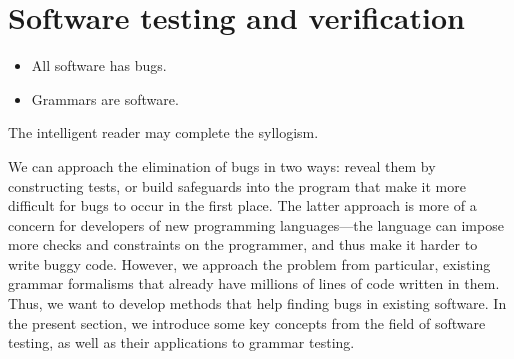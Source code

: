 \section{Software testing and verification}
\label{sec:testing-intro} 

\begin{itemize}
\item All software has bugs.
\item Grammars are software.
\end{itemize}

\noindent The intelligent reader may complete the syllogism.

We can approach the elimination of bugs in two ways: reveal them
by constructing tests, or build safeguards into the program that
make it more difficult for bugs to occur in the first place. The
latter approach is more of a concern for developers of new programming
languages---the language can impose more checks and constraints on the
programmer, and thus make it harder to write buggy code. However, we
approach the problem from particular, existing grammar formalisms that
already have millions of lines of code written in them. Thus, we want
to develop methods that help finding bugs in existing software.
In the present section, we introduce some key concepts from the field of
software testing, as well as their applications to grammar testing.



